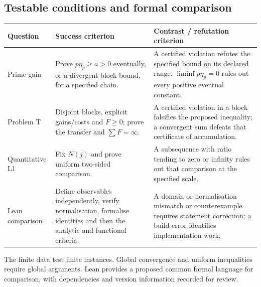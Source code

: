 \documentclass[11pt,a4paper]{article}
\newenvironment{tabla}{\par\smallskip\small}{\par\smallskip}
\begin{document}
\subsection{Testable conditions and formal comparison}
\begin{tabla}\begin{xltabular}{\linewidth}{@{}P{2.9cm}LL@{}}\toprule
Question&Success criterion&Contrast / refutation criterion\\\midrule\endhead
Prime gain&Prove $p\eta_p\ge a>0$ eventually, or a divergent block bound, for a specified chain.&A certified violation refutes the specified bound on its declared range. $\liminf p\eta_p=0$ rules out every positive eventual constant.\\
Problem T&Disjoint blocks, explicit gains/costs and $F\ge0$; prove the transfer and $\sum F=\infty$.&A certified violation in a block falsifies the proposed inequality; a convergent sum defeats that certificate of accumulation.\\
Quantitative L1&Fix $N(j)$ and prove uniform two-sided comparison.&A subsequence with ratio tending to zero or infinity rules out that comparison at the specified scale.\\
Lean comparison&Define observables independently, verify normalisation, formalise identities and then the analytic and functional criteria.&A domain or normalisation mismatch or counterexample requires statement correction; a build error identifies implementation work.\\\bottomrule\end{xltabular}\end{tabla}
The finite data test finite instances. Global convergence and uniform inequalities require global arguments. Lean provides a proposed common formal language for comparison, with dependencies and version information recorded for review.
\end{document}

